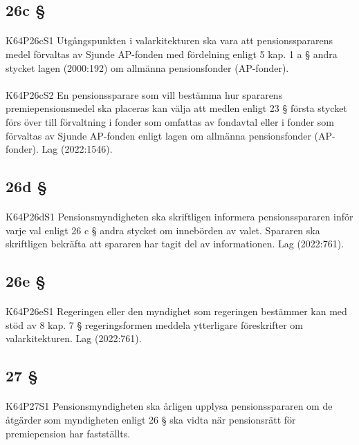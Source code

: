 \documentclass[a4paper,notitlepage,openany,10pt]{book}
\begin{document}
\subsection*{26c §}
\paragraph*{}
{\tiny K64P26cS1}
Utgångspunkten i valarkitekturen ska vara att pensionsspararens medel förvaltas av Sjunde AP-fonden med fördelning enligt 5 kap. 1 a § andra stycket lagen (2000:192) om allmänna pensionsfonder (AP-fonder).
\paragraph*{}
{\tiny K64P26cS2}
En pensionssparare som vill bestämma hur spararens premiepensionsmedel ska placeras kan välja att medlen enligt 23 § första stycket förs över till förvaltning i fonder som omfattas av fondavtal eller i fonder som förvaltas av Sjunde AP-fonden enligt lagen om allmänna pensionsfonder (AP-fonder).
Lag (2022:1546).
\subsection*{26d §}
\paragraph*{}
{\tiny K64P26dS1}
Pensionsmyndigheten ska skriftligen informera pensionsspararen inför varje val enligt 26 c § andra stycket om innebörden av valet. Spararen ska skriftligen bekräfta att spararen har tagit del av informationen.
Lag (2022:761).
\subsection*{26e §}
\paragraph*{}
{\tiny K64P26eS1}
Regeringen eller den myndighet som regeringen bestämmer kan med stöd av 8 kap. 7 § regeringsformen meddela ytterligare föreskrifter om valarkitekturen.
Lag (2022:761).
\subsection*{27 §}
\paragraph*{}
{\tiny K64P27S1}
Pensionsmyndigheten ska årligen upplysa pensionsspararen om de åtgärder som myndigheten enligt 26 § ska vidta när pensionsrätt för premiepension har fastställts.
\end{document}
